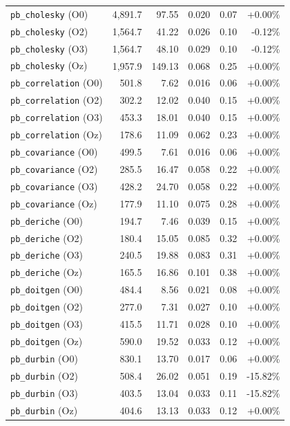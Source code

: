 {\begin{longtable}{lrrrrr}
\texttt{pb\_cholesky} (O0) & 4,891.7 & 97.55 & 0.020 & 0.07 & +0.00\% \\
\texttt{pb\_cholesky} (O2) & 1,564.7 & 41.22 & 0.026 & 0.10 & -0.12\% \\
\texttt{pb\_cholesky} (O3) & 1,564.7 & 48.10 & 0.029 & 0.10 & -0.12\% \\
\texttt{pb\_cholesky} (Oz) & 1,957.9 & 149.13 & 0.068 & 0.25 & +0.00\% \\
\texttt{pb\_correlation} (O0) & 501.8 & 7.62 & 0.016 & 0.06 & +0.00\% \\
\texttt{pb\_correlation} (O2) & 302.2 & 12.02 & 0.040 & 0.15 & +0.00\% \\
\texttt{pb\_correlation} (O3) & 453.3 & 18.01 & 0.040 & 0.15 & +0.00\% \\
\texttt{pb\_correlation} (Oz) & 178.6 & 11.09 & 0.062 & 0.23 & +0.00\% \\
\texttt{pb\_covariance} (O0) & 499.5 & 7.61 & 0.016 & 0.06 & +0.00\% \\
\texttt{pb\_covariance} (O2) & 285.5 & 16.47 & 0.058 & 0.22 & +0.00\% \\
\texttt{pb\_covariance} (O3) & 428.2 & 24.70 & 0.058 & 0.22 & +0.00\% \\
\texttt{pb\_covariance} (Oz) & 177.9 & 11.10 & 0.075 & 0.28 & +0.00\% \\
\texttt{pb\_deriche} (O0) & 194.7 & 7.46 & 0.039 & 0.15 & +0.00\% \\
\texttt{pb\_deriche} (O2) & 180.4 & 15.05 & 0.085 & 0.32 & +0.00\% \\
\texttt{pb\_deriche} (O3) & 240.5 & 19.88 & 0.083 & 0.31 & +0.00\% \\
\texttt{pb\_deriche} (Oz) & 165.5 & 16.86 & 0.101 & 0.38 & +0.00\% \\
\texttt{pb\_doitgen} (O0) & 484.4 & 8.56 & 0.021 & 0.08 & +0.00\% \\
\texttt{pb\_doitgen} (O2) & 277.0 & 7.31 & 0.027 & 0.10 & +0.00\% \\
\texttt{pb\_doitgen} (O3) & 415.5 & 11.71 & 0.028 & 0.10 & +0.00\% \\
\texttt{pb\_doitgen} (Oz) & 590.0 & 19.52 & 0.033 & 0.12 & +0.00\% \\
\texttt{pb\_durbin} (O0) & 830.1 & 13.70 & 0.017 & 0.06 & +0.00\% \\
\texttt{pb\_durbin} (O2) & 508.4 & 26.02 & 0.051 & 0.19 & -15.82\% \\
\texttt{pb\_durbin} (O3) & 403.5 & 13.04 & 0.033 & 0.11 & -15.82\% \\
\texttt{pb\_durbin} (Oz) & 404.6 & 13.13 & 0.033 & 0.12 & +0.00\% \\

\end{longtable}}
